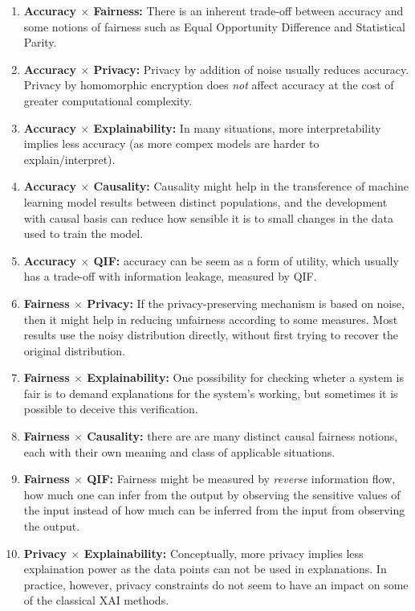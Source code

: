 \documentclass[conference]{IEEEtran}
\begin{document}
\begin{enumerate}
    \item \textbf{Accuracy $\times$ Fairness:} There is an inherent trade-off between accuracy and some notions of fairness such as Equal Opportunity Difference and Statistical Parity.
    \item \textbf{Accuracy $\times$ Privacy:} Privacy by addition of noise usually reduces accuracy. Privacy by homomorphic encryption does \emph{not} affect accuracy at the cost of greater computational complexity.
    \item \textbf{Accuracy $\times$ Explainability:} In many situations, more interpretability implies less accuracy (as more compex models are harder to explain/interpret).
    \item \textbf{Accuracy $\times$ Causality:} Causality might help in the transference of machine learning model results between distinct populations, and the development with causal basis can reduce how sensible it is to small changes in the data used to train the model.
    \item \textbf{Accuracy $\times$ QIF:} accuracy can be seem as a form of utility, which usually has a trade-off with information leakage, measured by QIF.
    \item \textbf{Fairness $\times$ Privacy:} If the privacy-preserving mechanism is based on noise, then it might help in reducing unfairness according to some measures. Most results use the noisy distribution directly, without first trying to recover the original distribution.
    \item \textbf{Fairness $\times$ Explainability:} One possibility for checking wheter a system is fair is to demand explanations for the system's working, but sometimes it is possible to deceive this verification.
    \item \textbf{Fairness $\times$ Causality:} there are are many distinct causal fairness notions, each with their own meaning and class of applicable situations.
    \item \textbf{Fairness $\times$ QIF:} Fairness might be measured by \emph{reverse} information flow, how much one can infer from the output by observing the sensitive values of the input instead of how much can be inferred from the input from observing the output.
    \item \textbf{Privacy $\times$ Explainability:} Conceptually, more privacy implies less explaination power as the data points can not be used in explanations. In practice, however, privacy constraints do not seem to have an impact on some of the classical XAI methods.

\end{enumerate}
\end{document}
